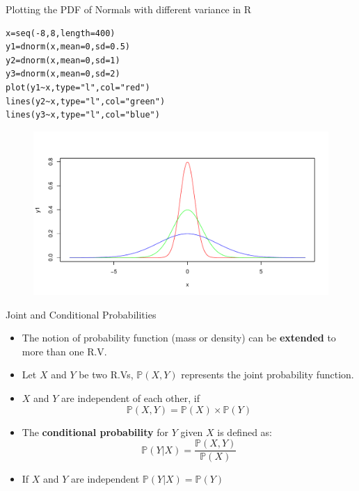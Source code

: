 \documentclass[handout]{beamer}
\begin{document}
\begin{frame}[fragile]{Plotting the PDF of Normals with different variance in R}
\scriptsize{
\begin{verbatim}
x=seq(-8,8,length=400)
y1=dnorm(x,mean=0,sd=0.5)
y2=dnorm(x,mean=0,sd=1) 
y3=dnorm(x,mean=0,sd=2)
plot(y1~x,type="l",col="red")
lines(y2~x,type="l",col="green")
lines(y3~x,type="l",col="blue")
\end{verbatim}
}
 \begin{figure}[h!]
	\centering
	\includegraphics[scale=0.35]{pics/normplot.pdf}
\end{figure}



\end{frame}




\begin{frame}{Joint and Conditional Probabilities}
\scriptsize{
\begin{itemize}
 \item The notion of probability function (mass or density) can be \textbf{extended} to more than one R.V.  
 \item Let $X$ and $Y$ be two R.Vs, $\mathbb{P}(X,Y)$ represents the joint probability function.
 \item $X$ and $Y$ are independent of each other, if
 \begin{displaymath}
\mathbb{P}(X,Y)=\mathbb{P}(X)\times \mathbb{P}(Y)                                                     \end{displaymath}
\item The \textbf{conditional probability} for $Y$ given $X$ is defined as:
 \begin{displaymath}
  \mathbb{P}(Y|X) = \frac{\mathbb{P}(X,Y)}{\mathbb{P}(X)}
 \end{displaymath}
\item  If $X$ and $Y$ are independent $\mathbb{P}(Y|X)=\mathbb{P}(Y)$
\end{itemize}




} 
\end{frame}
\end{document}

